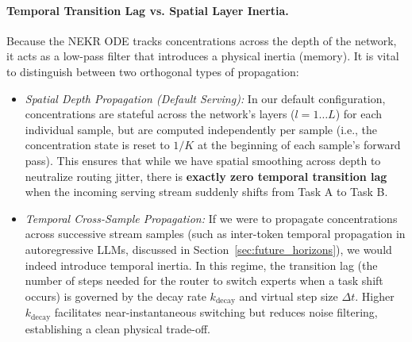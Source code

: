 \paragraph{Temporal Transition Lag vs. Spatial Layer Inertia.}
Because the NEKR ODE tracks concentrations across the depth of the network, it acts as a low-pass filter that introduces a physical inertia (memory). It is vital to distinguish between two orthogonal types of propagation:
\begin{itemize}
    \item \emph{Spatial Depth Propagation (Default Serving):} In our default configuration, concentrations are stateful across the network's layers ($l = 1 \dots L$) for each individual sample, but are computed independently per sample (i.e., the concentration state is reset to $1/K$ at the beginning of each sample's forward pass). This ensures that while we have spatial smoothing across depth to neutralize routing jitter, there is \textbf{exactly zero temporal transition lag} when the incoming serving stream suddenly shifts from Task A to Task B.
    \item \emph{Temporal Cross-Sample Propagation:} If we were to propagate concentrations across successive stream samples (such as inter-token temporal propagation in autoregressive LLMs, discussed in Section~\ref{sec:future_horizons}), we would indeed introduce temporal inertia. In this regime, the transition lag (the number of steps needed for the router to switch experts when a task shift occurs) is governed by the decay rate $k_{\text{decay}}$ and virtual step size $\Delta t$. Higher $k_{\text{decay}}$ facilitates near-instantaneous switching but reduces noise filtering, establishing a clean physical trade-off.
\end{itemize}

